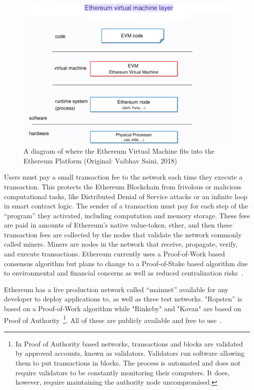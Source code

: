 \begin{figure}[h]
  \centering
  \includegraphics[width=1\linewidth]{imgs/ethereumVirtualMachine.png}
  \caption{\label{fig:evm} A diagram of where the Ethereum Virtual Machine fits
  into the Ethereum Platform (Original: Vaibhav Saini, 2018)}
\end{figure}

Users must pay a small transaction fee to the network each time they execute a
transaction. This protects the Ethereum Blockchain from frivolous or malicious
computational tasks, like Distributed Denial of Service attacks or an infinite
loop in smart contract logic. The sender of a transaction must pay for each
step of the “program” they activated, including computation and memory storage.
These fees are paid in amounts of Ethereum’s native value-token, ether, and
then these transaction fees are collected by the nodes that validate the
network commonly called miners. Miners are nodes in the network that receive,
propagate, verify, and execute transactions. Ethereum currently uses a
Proof-of-Work based consensus algorithm but plans to change to a Proof-of-Stake
based algorithm due to environmental and financial concerns as well as reduced
centralization risks~\cite{EthereumDocs2018,EthereumPOSFAQ2018}.

Ethereum has a live production network called “mainnet” available for any
developer to deploy applications to, as well as three test networks. "Ropsten”
is based on a Proof-of-Work algorithm while "Rinkeby" and "Kovan" are based on
Proof of Authority~\footnote{In Proof of Authority based networks, transactions
and blocks are validated by approved accounts, known as validators. Validators
run software allowing them to put transactions in blocks. The process is
automated and does not require validators to be constantly monitoring their
computers. It does, however, require maintaining the authority node
uncompromised.}. All of these are publicly available and free to
use~\cite{Barclay2017,EthereumTestNetworks2018}.

